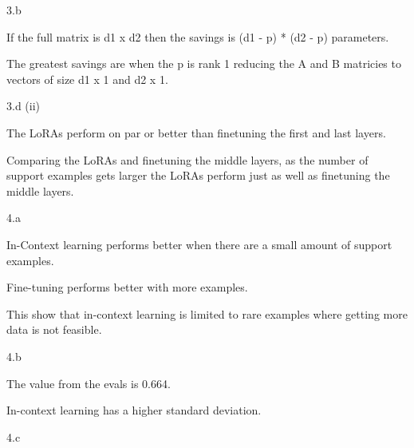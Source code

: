 \clearpage

\LARGE
3.b
\normalsize

\begin{answer}
    If the full matrix is d1 x d2 then the savings is (d1 - p) * (d2 - p) parameters.

    The greatest savings are when the p is rank 1 reducing the A and B matricies to vectors of size d1 x 1 and d2 x 1. 
\end{answer}

\LARGE
3.d (ii)
\normalsize

\begin{answer}
    The LoRAs perform on par or better than finetuning the first and last layers.  

    Comparing the LoRAs and finetuning the middle layers, as the number of support examples gets larger the LoRAs perform just as well as finetuning the middle layers.
\end{answer}

\clearpage

\LARGE
4.a
\normalsize

\begin{answer}
    In-Context learning performs better when there are a small amount of support examples. 
    
    Fine-tuning performs better with more examples.

    This show that in-context learning is limited to rare examples where getting more data is not feasible. 
\end{answer}

\LARGE
4.b
\normalsize

\begin{answer}
    The value from the evals is 0.664. 

    In-context learning has a higher standard deviation.
\end{answer}

\LARGE
4.c
\normalsize

\begin{answer}
\end{answer}


